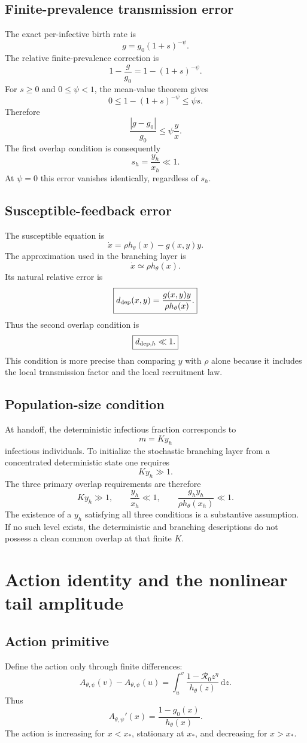 \documentclass[11pt]{article}
\newcommand{\Rzero}{\mathcal R_0}
\newcommand{\hth}{h_\theta}
\newcommand{\Apsi}{A_{\theta,\psi}}
\newcommand{\xs}{x_*}
\newcommand{\dd}{\,\mathrm{d}}
\newcommand{\gh}{g_0}
\begin{document}
\subsection{Finite-prevalence transmission error}
The exact per-infective birth rate is
\[
g=\gh(1+s)^{-\psi}.
\]
The relative finite-prevalence correction is
\[
1-\frac g{\gh}
=1-(1+s)^{-\psi}.
\]
For $s\geq0$ and $0\leq\psi<1$, the mean-value theorem gives
\[
0\leq1-(1+s)^{-\psi}\leq\psi s.
\]
Therefore
\[
\boxed{
\frac{|g-\gh|}{\gh}\leq\psi\frac yx.
}
\]
The first overlap condition is consequently
\[
\boxed{s_h=\frac{y_h}{x_h}\ll1.}
\]
At $\psi=0$ this error vanishes identically, regardless of $s_h$.

\subsection{Susceptible-feedback error}
The susceptible equation is
\[
\dot x=\rho\hth(x)-g(x,y)y.
\]
The approximation used in the branching layer is
\[
\dot x\simeq\rho\hth(x).
\]
Its natural relative error is
\[
\boxed{
d_{\rm dep}(x,y)=\frac{g(x,y)y}{\rho\hth(x)}.}
\]
Thus the second overlap condition is
\[
\boxed{d_{{\rm dep},h}\ll1.}
\]
This condition is more precise than comparing $y$ with $\rho$ alone because it includes the local transmission factor and the local recruitment law.

\subsection{Population-size condition}
At handoff, the deterministic infectious fraction corresponds to
\[
m=Ky_h
\]
infectious individuals. To initialize the stochastic branching layer from a concentrated deterministic state one requires
\[
\boxed{Ky_h\gg1.}
\]
The three primary overlap requirements are therefore
\[
\boxed{
Ky_h\gg1,
\qquad
\frac{y_h}{x_h}\ll1,
\qquad
\frac{g_hy_h}{\rho\hth(x_h)}\ll1.
}
\]
The existence of a $y_h$ satisfying all three conditions is a substantive assumption. If no such level exists, the deterministic and branching descriptions do not possess a clean common overlap at that finite $K$.

\section{Action identity and the nonlinear tail amplitude}
\label{sec:action}

\subsection{Action primitive}
Define the action only through finite differences:
\[
\boxed{
\Apsi(v)-\Apsi(u)
=\int_u^v\frac{1-\Rzero z^\eta}{\hth(z)}\dd z.
}
\]
Thus
\[
\Apsi'(x)=\frac{1-\gh(x)}{\hth(x)}.
\]
The action is increasing for $x<\xs$, stationary at $\xs$, and decreasing for $x>\xs$.
\end{document}
